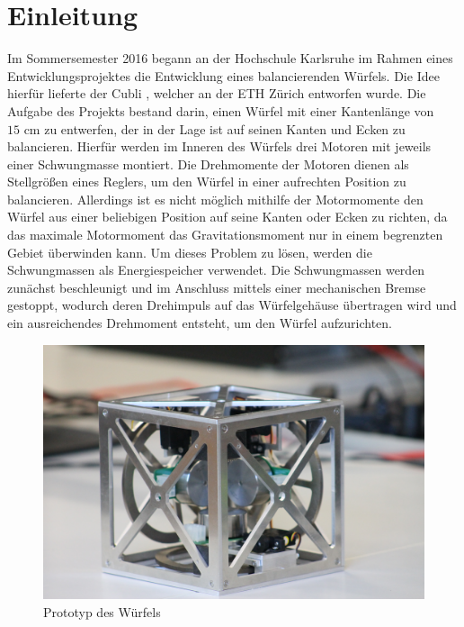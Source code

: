 \chapter{Einleitung}
Im Sommersemester 2016 begann an der Hochschule Karlsruhe im Rahmen eines Entwicklungsprojektes die Entwicklung eines balancierenden Würfels. Die Idee hierfür lieferte der Cubli \cite{Cubli1}, welcher an der ETH Zürich entworfen wurde. Die Aufgabe des Projekts bestand darin, einen Würfel mit einer Kantenlänge von $15\text{ cm}$ zu entwerfen, der in der Lage ist auf seinen Kanten und Ecken zu balancieren. Hierfür werden im Inneren des Würfels drei Motoren mit jeweils einer Schwungmasse montiert. Die Drehmomente der Motoren dienen als Stellgrößen eines Reglers, um den Würfel in einer aufrechten Position zu balancieren. Allerdings ist es nicht möglich mithilfe der Motormomente den Würfel aus einer beliebigen Position auf seine Kanten oder Ecken zu richten, da das maximale Motormoment das Gravitationsmoment nur in einem begrenzten Gebiet überwinden kann. Um dieses Problem zu lösen, werden die Schwungmassen als Energiespeicher verwendet. Die Schwungmassen werden zunächst beschleunigt und im Anschluss mittels einer mechanischen Bremse gestoppt, wodurch deren Drehimpuls auf das Würfelgehäuse übertragen wird und ein ausreichendes Drehmoment entsteht, um den Würfel aufzurichten.
\begin{figure}[!ht]
\centering
\includegraphics[width=0.85\linewidth]{img/3D_Modell_img.jpg}
\caption{Prototyp des Würfels}
\end{figure}


